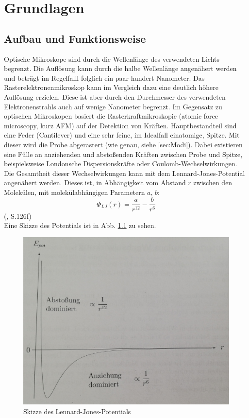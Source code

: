 
\chapter{Grundlagen}
\section{Aufbau und Funktionsweise}
Optische Mikroskope sind durch die Wellenlänge des verwendeten Lichts begrenzt. Die Auflösung kann durch die halbe Wellenlänge angenähert werden und beträgt im Regelfalll 
folglich ein paar hundert Nanometer. Das Rasterelektronenmikroskop kann im Vergleich dazu eine deutlich höhere Auflösung erzielen. Diese ist aber durch 
den Durchmesser des verwendeten Elektronenstrahls auch auf wenige Nanometer begrenzt.
Im Gegensatz zu optischen Mikroskopen basiert die Rasterkraftmikroskopie (atomic force microscopy, kurz AFM) auf der Detektion von Kräften. 
Hauptbestandteil sind eine Feder (Cantilever) und eine sehr feine, im Idealfall einatomige, Spitze. Mit dieser wird die Probe abgerastert 
(wie genau, siehe \ref{sec:Modi}). Dabei existieren eine Fülle an anziehenden und abstoßenden Kräften zwischen Probe und Spitze, beispielsweise 
Londonsche Dispersionskräfte oder Coulomb-Wechselwirkungen. Die Gesamtheit dieser Wechselwirkungen kann mit dem Lennard-Jones-Potential 
angenähert werden. Dieses ist, in Abhängigkeit vom Abstand $r$ zwischen den Molekülen, mit molekülabhängigen Parametern $a$, $b$: 
\begin{equation*}
    \Phi_{LJ}(r) = \frac{a}{r^{12}} - \frac{b}{r^6}
\end{equation*}
(\cite{Demtroeder2013}, S.126f) \\
Eine Skizze des Potentials ist in Abb. \ref{bild:LJP} zu sehen.

\begin{figure}[h]
    \centering
    \includegraphics[scale = 0.135]{Bilder/LennardJones.jpg}
    \caption{Skizze des Lennard-Jones-Potentials \protect \footnotemark}
    \label{bild:LJP}
\end{figure}

